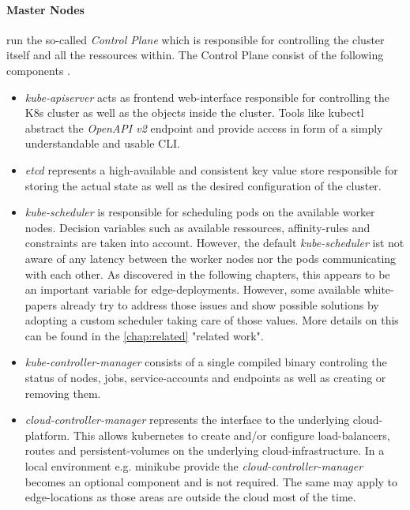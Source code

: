 \documentclass[MSC,Master,english]{twbook}%
\begin{document}
\paragraph{Master Nodes} run the so-called \textit{Control Plane} which is responsible for controlling the cluster itself and all the ressources within. The Control Plane consist of the following components \cite{k8scomp}.
\begin{itemize}
    \item \textit{kube-apiserver} acts as frontend web-interface responsible for controlling the \ac{K8s} cluster as well as the objects inside the cluster. Tools like kubectl abstract the \textit{OpenAPI v2} endpoint and provide access in form of a simply understandable and usable \ac{CLI}. 
    \item \textit{etcd} represents a high-available and consistent key value store responsible for storing the actual state as well as the desired configuration of the cluster.
    \item \textit{kube-scheduler} is responsible for scheduling pods on the available worker nodes. Decision variables such as available ressources, affinity-rules and constraints are taken into account. However, the default \textit{kube-scheduler} ist not aware of any latency between the worker nodes nor the pods communicating with each other. As discovered in the following chapters, this appears to be an important variable for edge-deployments. However, some available white-papers already try to address those issues and show possible solutions by adopting a custom scheduler taking care of those values. More details on this can be found in the \autoref{chap:related} "related work".
    \item \textit{kube-controller-manager} consists of a single compiled binary controling the status of nodes, jobs, service-accounts and endpoints as well as creating or removing them.
    \item \textit{cloud-controller-manager} represents the interface to the underlying cloud-platform. This allows kubernetes to create and/or configure load-balancers, routes and persistent-volumes on the underlying cloud-infrastructure. In a local environment e.g. minikube \cite{minikube} provide the \textit{cloud-controller-manager} becomes an optional component and is not required. The same may apply to edge-locations as those areas are outside the cloud most of the time.
\end{itemize}
\end{document}
